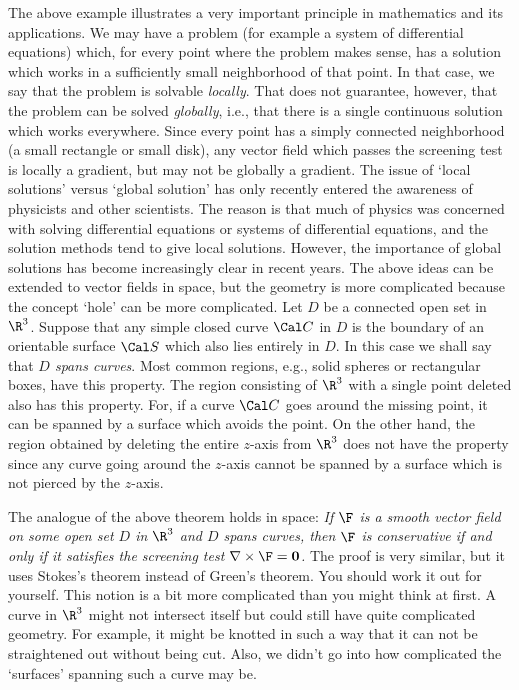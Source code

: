 The above example illustrates a very important principle in
mathematics and its applications.  We may have a problem
(for example a system of differential equations) which,
for every point where the problem makes sense, has a solution
which works in a sufficiently small neighborhood of that point.
In that case, we say that the problem is solvable {\it locally}.
%
%
That does not guarantee, however, that the problem
can be solved {\it globally\/}, i.e., that there is a single
continuous solution which works everywhere.  Since every point
has a simply connected neighborhood (a small rectangle or small disk),
any vector field which passes the screening test is locally
a gradient, but may not be globally a gradient.
The issue of `local solutions' versus `global solution' has
only recently entered the awareness of physicists and other
scientists.  The reason is that much of physics was concerned
with solving differential equations or systems of differential
equations, and the solution methods tend to give local solutions.
However, the importance of global solutions has become increasingly
clear in recent years.
\medskip
{}
The above ideas can be extended to vector fields in space, but
the geometry is more complicated because the concept
`hole' can be more complicated.   Let  $D$  be a connected
open set in
$\R^3$.  
Suppose that
 any simple closed curve $\Cal C$ in $D$ is the boundary of an
orientable
surface $\Cal S$ which also lies entirely in $D$. 
In this case we shall say that {\it $D$ spans curves}.
%
  Most common
regions, e.g., solid spheres or rectangular boxes, have this
property. 
The region consisting of $\R^3$ with a single point deleted also
has this property. 
 For, if a curve $\Cal C$ goes around the missing point,
it can be spanned by a surface which avoids the point.  On the
other hand, the region obtained by deleting the entire $z$-axis
from $\R^3$ does not have the property since any curve going
around the $z$-axis cannot be spanned by a surface which is
not pierced by the $z$-axis. 
\medskip
\centerline{}
\medskip
The analogue of the above theorem holds in space:  {\it If $\F$
is a smooth vector field on some open set $D$ in $\R^3$
and $D$ spans curves, then  $\F$ is conservative if and only
if it satisfies the screening test  $\nabla\times\F = \bold 0$.}
The proof is very similar, but it uses Stokes's theorem instead
of Green's theorem.  You should work it out for yourself.
\medskip
This notion is a bit more complicated than you might think at
first.  A curve in $\R^3$ might not intersect itself but could still
have quite complicated geometry.  For example, it might be knotted
in such a way that it can not be straightened out without 
being cut.  Also, we didn't go into how complicated the `surfaces'
spanning such a curve may be.

